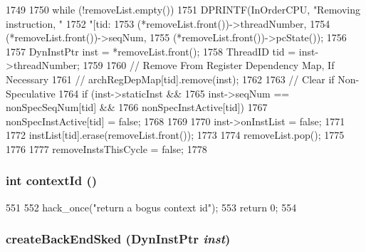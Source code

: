 \begin{DoxyCode}
1749 {
1750     while (!removeList.empty()) {
1751         DPRINTF(InOrderCPU, "Removing instruction, "
1752                 "[tid:%
1753                 (*removeList.front())->threadNumber,
1754                 (*removeList.front())->seqNum,
1755                (*removeList.front())->pcState());
1756 
1757         DynInstPtr inst = *removeList.front();
1758         ThreadID tid = inst->threadNumber;
1759 
1760         // Remove From Register Dependency Map, If Necessary
1761         // archRegDepMap[tid].remove(inst);
1762 
1763         // Clear if Non-Speculative
1764         if (inst->staticInst &&
1765             inst->seqNum == nonSpecSeqNum[tid] &&
1766             nonSpecInstActive[tid]) {
1767             nonSpecInstActive[tid] = false;
1768         }
1769 
1770         inst->onInstList = false;
1771 
1772         instList[tid].erase(removeList.front());
1773 
1774         removeList.pop();
1775     }
1776 
1777     removeInstsThisCycle = false;
1778 }
\end{DoxyCode}
\hypertarget{classInOrderCPU_ac67c5e8e61fd7fe48edb5d70cb7aa490}{
\subsubsection[{contextId}]{\setlength{\rightskip}{0pt plus 5cm}int contextId ()}}
\label{classInOrderCPU_ac67c5e8e61fd7fe48edb5d70cb7aa490}



\begin{DoxyCode}
551     {
552         hack_once("return a bogus context id");
553         return 0;
554     }
\end{DoxyCode}
\hypertarget{classInOrderCPU_a431a92852eabc4329954c5f2ad9c5cf5}{
\subsubsection[{createBackEndSked}]{ createBackEndSked ({\bf DynInstPtr} {\em inst})}}
\label{classInOrderCPU_a431a92852eabc4329954c5f2ad9c5cf5}



